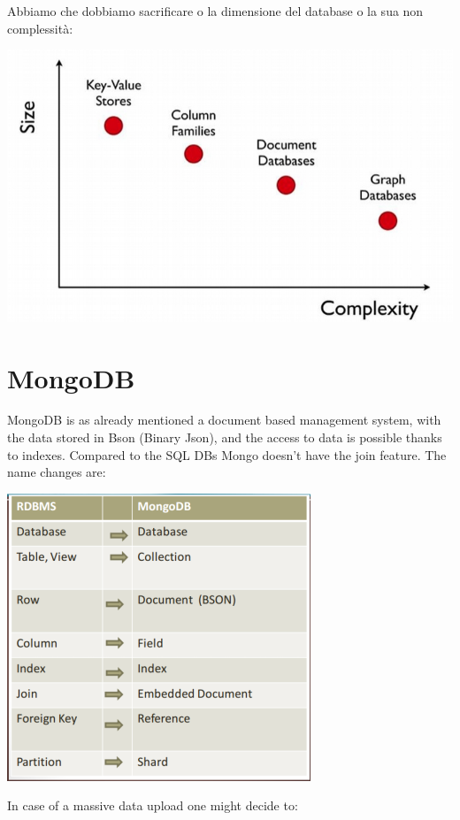 \documentclass[a4page, 11pt]{article}
\begin{document}
Abbiamo che dobbiamo sacrificare o la dimensione del database o la sua non complessità:
\begin{center}
	\includegraphics[scale=0.5]{IMAGE1.jpg}
\end{center}



\section{MongoDB}
MongoDB is as already mentioned a document based management system, with the data stored in Bson (Binary Json), and the access to data is possible thanks to indexes. Compared to the SQL DBs Mongo doesn't have the join feature. The name changes are:

\begin{center}
	\includegraphics[scale=0.6]{IMAGE2.jpg}
\end{center}
In case of a massive data upload one might decide to:
\end{document}
